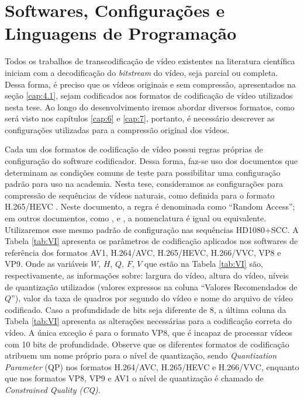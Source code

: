 \section{Softwares, Configurações e Linguagens de Programação}
\label{cap:4.2}

Todos os trabalhos de transcodificação de vídeo existentes na literatura científica iniciam com a decodificação do \textit{bitstream} do vídeo, seja parcial ou completa. Dessa forma, é preciso que os vídeos originais e sem compressão, apresentados na seção \ref{cap:4.1}, sejam codificados aos formatos de codificação de vídeo utilizados nesta tese. Ao longo do desenvolvimento iremos abordar diversos formatos, como será visto nos capítulos \ref{cap:6} e \ref{cap:7}, portanto, é necessário descrever as configurações utilizadas para a compressão original dos vídeos. 



Cada um dos formatos de codificação de vídeo possui regras próprias de configuração do software codificador. Dessa forma, faz-se uso dos documentos que determinam as condições comuns de teste para possibilitar uma configuração padrão para uso na academia. Nesta tese, consideramos as configurações para compressão de sequências de vídeos naturais, como definida para o formato H.265/HEVC \cite{bib:hevcctc}. Neste documento, a regra é denominada como ``Random Access''; em outros documentos, como \citet{bib:vvcctc}, \cite{bib:av2_avm} e \citet{bib:ietfnetvct}, a nomenclatura é igual ou equivalente. Utilizaremos esse mesmo padrão de configuração nas sequências HD1080+SCC. A Tabela \ref{tab:VI} apresenta os parâmetros de codificação aplicados nos softwares de referência dos formatos AV1, H.264/AVC, H.265/HEVC, H.266/VVC, VP8 e VP9. Onde as variáveis $W$, $H$, $Q$, $F$, $V$ que estão na Tabela \ref{tab:VI} são, respectivamente, as informações sobre: largura do vídeo, altura do vídeo, níveis de quantização utilizados (valores expressos na coluna ``Valores Recomendados de $Q$''), valor da taxa de quadros por segundo do vídeo e nome do arquivo de vídeo codificado. Caso a profundidade de bits seja diferente de 8, a última coluna da Tabela \ref{tab:VI} apresenta as alterações necessárias para a codificação correta do vídeo. A única exceção é para o formato VP8, que é incapaz de processar vídeos com 10 bits de profundidade. Observe que os diferentes formatos de codificação atribuem um nome próprio para o nível de quantização, sendo \textit{Quantization Parameter} (QP) nos formatos H.264/AVC, H.265/HEVC e H.266/VVC, enquanto que nos formatos VP8, VP9 e AV1 o nível de quantização é chamado de \textit{Constrained Quality (CQ)}.


